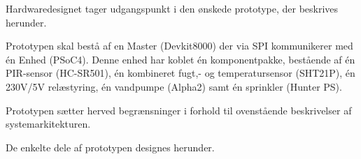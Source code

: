 Hardwaredesignet tager udgangspunkt i den ønskede prototype, der beskrives herunder.

Prototypen skal bestå af en Master (Devkit8000) der via SPI kommunikerer med én Enhed (PSoC4). Denne enhed har koblet én komponentpakke, bestående af én PIR-sensor (HC-SR501), én kombineret fugt,- og temperatursensor (SHT21P), én 230V/5V relæstyring, én vandpumpe (Alpha2) samt én sprinkler (Hunter PS).

Prototypen sætter herved begrænsninger i forhold til ovenstående beskrivelser af systemarkitekturen.

De enkelte dele af prototypen designes herunder.   


